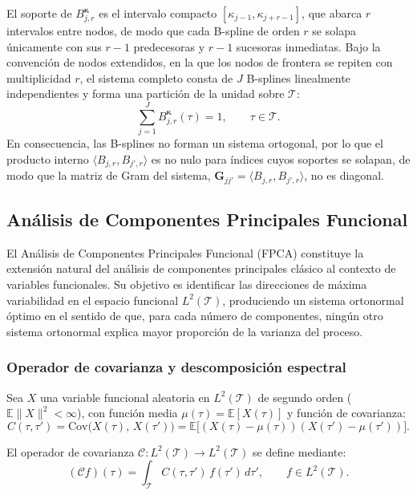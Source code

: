 El soporte de $B_{j,r}^{\boldsymbol{\kappa}}$ es el intervalo compacto $[\kappa_{j-1}, \kappa_{j+r-1}]$, que abarca $r$ intervalos entre nodos, de modo que cada B-spline de orden $r$ se solapa únicamente con sus $r-1$ predecesoras y $r-1$ sucesoras inmediatas. Bajo la convención de nodos extendidos, en la que los nodos de frontera se repiten con multiplicidad $r$, el sistema completo consta de $J$ B-splines linealmente independientes y forma una partición de la unidad sobre $\mathcal{T}$:
\begin{equation}
    \sum_{j=1}^{J} B_{j,r}^{\boldsymbol{\kappa}}(\tau) = 1,
    \qquad \tau \in \mathcal{T}.
\end{equation}
En consecuencia, las B-splines no forman un sistema ortogonal, por lo que el producto interno $\langle B_{j,r}, B_{j',r}\rangle$ es no nulo para índices cuyos soportes se solapan, de modo que la matriz de Gram del sistema, $\mathbf{G}_{jj'} = \langle B_{j,r}, B_{j',r}\rangle$, no es diagonal.

\subsection{Análisis de Componentes Principales Funcional}
\label{02_01_04_fpca}
El Análisis de Componentes Principales Funcional (FPCA) constituye la extensión natural del análisis de componentes principales clásico al contexto de variables funcionales. Su objetivo es identificar las direcciones de máxima variabilidad en el espacio funcional $L^2(\mathcal{T})$, produciendo un sistema ortonormal óptimo en el sentido de que, para cada número de componentes, ningún otro sistema ortonormal explica mayor proporción de la varianza del proceso.

\subsubsection{Operador de covarianza y descomposición espectral}
\label{02_01_04_01_operador_covarianza}
Sea $X$ una variable funcional aleatoria en $L^2(\mathcal{T})$ de segundo orden ($\mathbb{E}\|X\|^2 < \infty$), con función media $\mu(\tau) = \mathbb{E}[X(\tau)]$ y función de covarianza:
\begin{equation}
    C(\tau, \tau') = \mathrm{Cov}\bigl(X(\tau),\, X(\tau')\bigr)
    = \mathbb{E}\bigl[(X(\tau) - \mu(\tau))
    (X(\tau') - \mu(\tau'))\bigr].
\end{equation}

El operador de covarianza $\mathcal{C}: L^2(\mathcal{T}) \to L^2(\mathcal{T})$ se define mediante:
\begin{equation}
    (\mathcal{C} f)(\tau) = \int_{\mathcal{T}} C(\tau, \tau')\, f(\tau')\, d\tau',
    \qquad f \in L^2(\mathcal{T}).
\end{equation}

